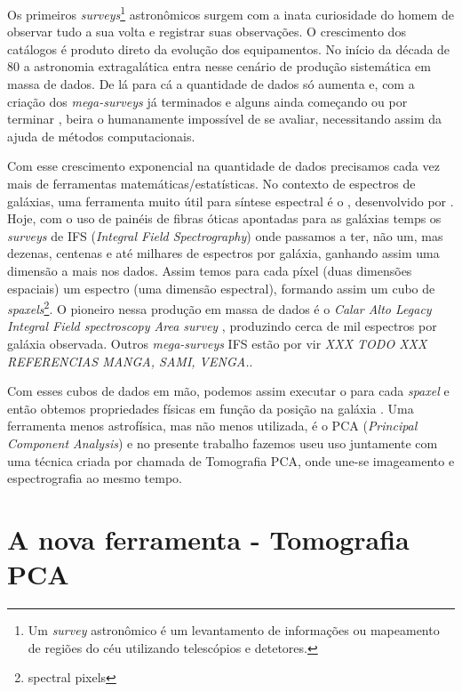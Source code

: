Os primeiros {\em surveys}\footnote{Um {\em survey} astronômico é um
levantamento de informações ou mapeamento de regiões do céu utilizando
telescópios e detetores.} astronômicos surgem com a inata curiosidade do homem
de observar tudo a sua volta e registrar suas observações. O crescimento
dos catálogos é produto direto da evolução dos equipamentos. No início da década de 80
\citep{Huchra1983} \citep{Huchra1988} \citep{DaCosta1988} a astronomia
extragalática entra nesse cenário de produção sistemática em massa de dados. De
lá para cá a quantidade de dados só aumenta e, com a criação dos
{\em mega-surveys} \citep[\SDSS; ][]{York2000} \citep[2dFGRS;][]{Colless1999}
\citep[2MASS;][]{Skrutskie2006} já terminados e alguns ainda começando ou por
terminar \citep[LSST; ][]{Ivezic2008} \citep[J-PAS;][]{Benitez2009}, beira o humanamente
impossível de se avaliar, necessitando assim da ajuda de métodos computacionais.

Com esse crescimento exponencial na quantidade de dados precisamos cada vez mais
de ferramentas matemáticas/estatísticas. No contexto de espectros de galáxias,
uma ferramenta muito útil para síntese espectral é o \starlight, desenvolvido
por \citet{CidFernandes2005}. Hoje, com o uso de painéis de fibras óticas
apontadas para as galáxias temps os {\em surveys} de IFS ({\em Integral Field
Spectrography})  onde passamos a ter, não um, mas dezenas, centenas e até
milhares de espectros por galáxia, ganhando assim uma dimensão a mais nos dados.
Assim temos para cada píxel (duas dimensões espaciais) um espectro (uma dimensão
espectral), formando assim um cubo de {\em spaxels}\footnote{spectral pixels}.
O pioneiro nessa produção em massa de dados é o {\em Calar Alto Legacy Integral
Field spectroscopy Area survey} \citep[CALIFA; ][]{CALIFAPresent2012},
produzindo cerca de mil espectros por galáxia observada. Outros {\em
mega-surveys} IFS estão por vir {\em XXX TODO XXX REFERENCIAS MANGA, SAMI, VENGA.}. 

Com esses cubos de dados em mão, podemos assim executar o \starlight para
cada {\em spaxel} e então obtemos propriedades físicas em função da posição na
galáxia \citep{CidFernandes20131}. Uma ferramenta menos astrofísica, mas não
menos utilizada, é o PCA ({\em Principal Component Analysis}) e no presente
trabalho fazemos useu uso juntamente com uma técnica criada por
\citet{Steiner2009} chamada de Tomografia PCA, onde une-se imageamento e
espectrografia ao mesmo tempo.

\section{A nova ferramenta - Tomografia PCA}
\label{sec:Intro:TomoPCA}


